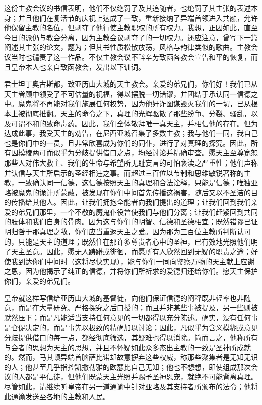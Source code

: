 这份主教会议的书信表明，他们不仅绝罚了及其追随者，也绝罚了其主张的表述本身；并且他们在复活节的庆祝上达成了一致，重新接纳了异端首领进入共融，允许他保留主教的名位，但剥夺了他行使主教职权的所有权力。我想，正因如此，直至今日的派仍与教会分离，因为主教会议剥夺了的一切权力。还应注意，曾写下一篇阐述其主张的论文，题为；但其书性质松散放荡，风格与韵律类似的歌曲。主教会议当时也谴责了这一作品。不仅主教会议不辞辛劳致函各教会宣告和平的恢复，而且皇帝本人也亲自致函教会，发出以下训词。\par

\par

君士坦丁奥古斯都，致亚历山大城的天主教会。亲爱的弟兄们，你们好！我们已从天主眷顾中领受了不可估量的祝福，得以摆脱一切错谬，并团结于承认同一信德之中。魔鬼将不再能对我们施展任何权势，因为他奸诈图谋毁灭我们的一切，已从根本上被彻底推翻。天主的命令之下，真理的光辉驱散了那些纷争、分裂、骚乱，以及可谓不和的致命毒药。因此，我们全体敬拜唯一真天主，并相信他的存在。但为达成此事，我受天主的劝告，在尼西亚城召集了多数主教；我与他们一同，我自己也是你们中的一员，且非常欣喜成为你们的同仆，进行了对真理的探究。因此，所有因模棱两可而似乎为分歧提供借口之点，均经讨论并精确审查。愿天主至尊宽恕那些人对伟大救主、我们的生命与希望所无耻妄言的可怕亵渎之严重性；他们声称并认信与天主所启示的圣经相违之事。而超过三百位以节制和思维敏锐著称的主教，一致确认同一信德，这信德按照天主的真理和合法诠释，只能是信德；唯独亚略被魔鬼的诡计所蒙蔽，被发现在你们中间首先传播这祸害，随后又以不圣洁的目的传播给其他人。因此，让我们拥抱全能者向我们提出的道理；让我们回到我们亲爱的弟兄们那里，一个不敬的魔鬼仆役曾使我们与他们分离；让我们赶紧回到共同的肢体和我们自身的骨肉。因为这与你们的明智、信德和圣德相宜；既然错谬已证明归咎于那真理之敌，你们应当重返天主之爱。因为那为三百位主教所判断认可的，只能是天主的道理；既然住在那许多尊贵者心中的圣神，已有效地光照他们明了天主圣意。因此，愿无人踌躇或徘徊，而愿所有人欣然回到无疑的职责之途；好使我到达你们中间时（这将尽快实现），能与你们一同向鉴察万物的天主献上应谢之恩，因为他揭示了纯正的信德，并将你们所祈求的爱德归还给你们。愿天主保护你们，亲爱的弟兄们。\par

皇帝就这样写信给亚历山大城的基督徒，向他们保证信德的阐释既非轻率也非随意，而是在大量研究、严格探究之后口授的；而且并非某些事被提及，另一些则被默然压下；而是凡能适当支持任何意见的一切都得以充分陈述。确实，没有任何事是仓促决定的，而是事先以极致的精确加以讨论；因此，凡似乎为含义模糊或意见分歧提供借口的每一点，都经彻底筛选，其疑难也得以消除。简而言之，他称所有与会者的思想为天主的思想，并且不怀疑如此众多杰出主教的一致是圣神所成就的。然而，马其顿异端首脑萨比诺却故意摒弃这些权威，称那些聚集者是无知无识的人；他甚至几乎指控凯撒勒雅的欧瑟比自己无知；他也不想想，即使组成那次会议的人都是平信徒，但他们既蒙天主光照并赐予圣神恩宠，就绝不可能背离真理。尽管如此，请继续听皇帝在另一道通谕中针对亚略及其支持者所颁布的法令；他将此通谕发送至各地的主教和人民。\par

